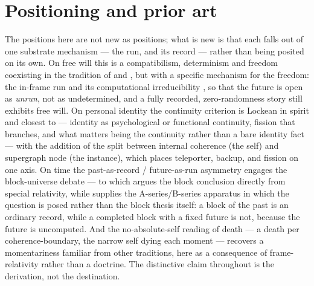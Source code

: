\documentclass[11pt,a4paper]{article}
\theoremstyle{remark}\newtheorem{remark}[definition]{Remark}
\begin{document}
\section{Positioning and prior art}\label{sec:prior-art}
The positions here are not new as positions; what is new is that each falls out of one
substrate mechanism --- the run, and its record --- rather than being posited on its
own. On free will this is a compatibilism, determinism and freedom coexisting in the
tradition of \citet{hume1748} and \citet{dennett1984}, but with a specific mechanism for
the freedom: the in-frame run and its computational irreducibility \citep{wolfram2002},
so that the future is open as \emph{unrun}, not as undetermined, and a fully recorded,
zero-randomness story still exhibits free will. On personal identity the continuity
criterion is Lockean in spirit \citep{locke1690} and closest to \citet{parfit1984} ---
identity as psychological or functional continuity, fission that branches, and what
matters being the continuity rather than a bare identity fact --- with the addition of
the split between internal coherence (the self) and supergraph node (the instance),
which places teleporter, backup, and fission on one axis. On time the past-as-record /
future-as-run asymmetry engages the block-universe debate --- to which \citet{putnam1967} argues
the block conclusion directly from special relativity, while \citet{mctaggart1908} supplies the
A-series/B-series apparatus in which the question is posed rather than the block thesis itself:
a block of the past is an ordinary record, while a completed block with a fixed future
is not, because the future is uncomputed. And the no-absolute-self reading of death ---
a death per coherence-boundary, the narrow self dying each moment --- recovers a
momentariness familiar from other traditions, here as a consequence of frame-relativity
rather than a doctrine. The distinctive claim throughout is the derivation, not the
destination.
\end{document}

